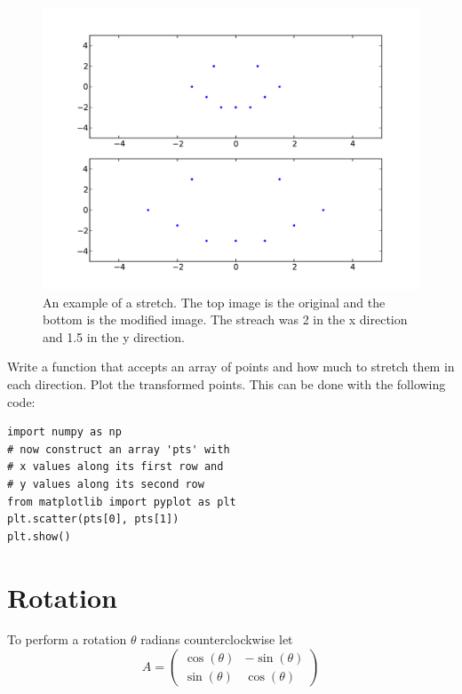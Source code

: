 \begin{figure}[H]
\includegraphics[scale = .5]{strench.pdf}
\caption{
An example of a stretch.
The top image is the original and the bottom is the modified image.
The streach was 2 in the x direction and 1.5 in the y direction.}
\end{figure}

\begin{problem}
Write a function that accepts an array of points and how much to stretch them in each direction.
Plot the transformed points.
This can be done with the following code:
\begin{lstlisting}
import numpy as np
# now construct an array 'pts' with
# x values along its first row and
# y values along its second row
from matplotlib import pyplot as plt
plt.scatter(pts[0], pts[1])
plt.show()
\end{lstlisting}
\end{problem}

\section*{Rotation}

To perform a rotation $\theta$ radians counterclockwise let
\[
A = \begin{pmatrix}
\cos(\theta) & -\sin(\theta) \\
\sin(\theta) & \cos(\theta) 
\end{pmatrix}
\]

